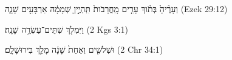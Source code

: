 
\begin{exe}

\ex\label{ex_numatel_time1}
\texthebrew{
וְעָרֶ֨יהָ֙ בְּתֹ֨וךְ עָרִ֤ים מָֽחֳרָבֹות֙ תִּֽהְיֶ֣יןָ שְׁמָמָ֔ה אַרְבָּעִ֖ים שָׁנָ֑ה 
} (Ezek 29:12)

\ex\label{ex_numatel_time2}
\texthebrew{
וַיִּמְלֹ֖ךְ שְׁתֵּים־עֶשְׂרֵ֥ה שָׁנָֽה׃ 
} (2 Kgs 3:1)

\ex\label{ex_numatel_time3}
\texthebrew{
וּשְׁלֹשִׁ֤ים וְאַחַת֙ שָׁנָ֔ה מָלַ֖ךְ בִּירוּשָׁלִָֽם׃ 
} (2 Chr 34:1)

\end{exe}
